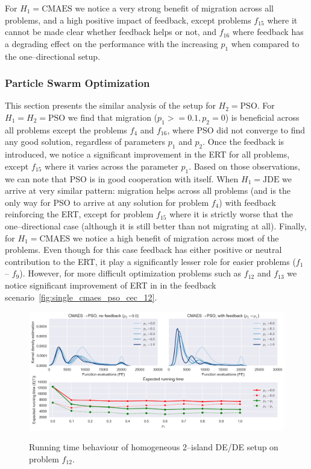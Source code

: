 \documentclass{sig-alternate}
\begin{document}
For $H_1 = \mbox{CMAES}$ we notice a very strong benefit of migration across all problems, and a high positive impact of feedback, except problems $f_{15}$ where it cannot be made clear whether feedback helps or not, and $f_{16}$ where feedback has a degrading effect on the performance with the increasing $p_1$ when compared to the one--directional setup.

\subsubsection{Particle Swarm Optimization}

This section presents the similar analysis of the setup for $H_2 = \mbox{PSO}$.
For $H_1 = H_2 = \mbox{PSO}$ we find that migration ($p_1 >= 0.1, p_2=0$) is beneficial across all problems except the problems $f_4$ and $f_{16}$, where PSO did not converge to find any good solution, regardless of parameters $p_1$ and $p_2$.
Once the feedback is introduced, we notice a significant improvement in the ERT for all problems, except $f_{15}$ where it varies across the parameter $p_1$.
Based on those observations, we can note that PSO is in good cooperation with itself.
When $H_1 = \mbox{JDE}$ we arrive at very similar pattern: migration helps across all problems (and is the only way for PSO to arrive at any solution for problem $f_4$) with feedback reinforcing the ERT, except for problem $f_{15}$ where it is strictly worse that the one--directional case (although it is still better than not migrating at all).
Finally, for $H_1 = \mbox{CMAES}$ we notice a high benefit of migration across most of the problems.
Even though for this case feedback has either positive or neutral contribution to the ERT, it play a significantly lesser role for easier problems ($f_1$ -- $f_9$).
However, for more difficult optimization problems such as $f_{12}$ and $f_{13}$ we notice significant improvement of ERT in in the feedback scenario~\ref{fig:single_cmaes_pso_cec_12}.
\begin{figure}[ht]
  \centering
  \includegraphics[width=\columnwidth]{figures/single_cmaes_pso_cec_12.png}
  \label{fig:single_cmaes_pso_12}
 \caption{Running time behaviour of homogeneous 2--island DE/DE setup on problem $f_{12}$.}
\end{figure}
\end{document}
